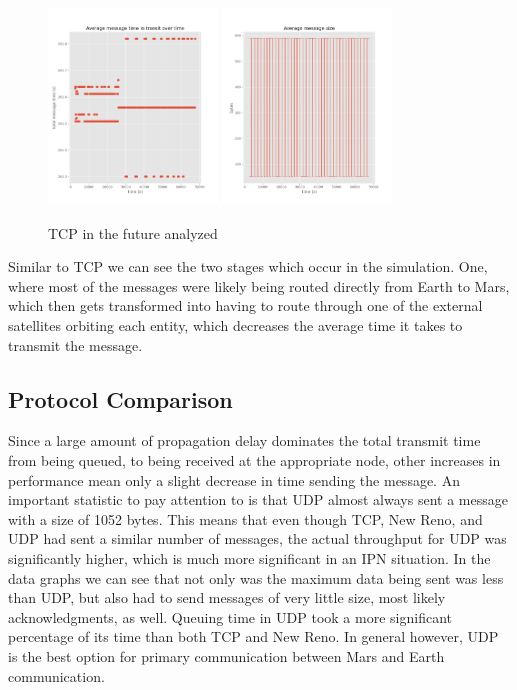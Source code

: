 \documentclass[a4paper,12pt]{article}
\begin{document}
\begin{figure}[h]
  \centering
  \includegraphics[width=0.4\textwidth]{media/new_reno.png}
  \includegraphics[width=0.4\textwidth]{media/new_reno_data.png}
  \caption{TCP in the future analyzed}
\end{figure}

Similar to TCP we can see the two stages which occur in the simulation. One,
where most of the messages were likely being routed directly from Earth to
Mars, which then gets transformed into having to route through one of the
external satellites orbiting each entity, which decreases the average time it
takes to transmit the message.

\subsection{Protocol Comparison}

Since a large amount of propagation delay dominates the total transmit time from
being queued, to being received at the appropriate node, other increases in
performance mean only a slight decrease in time sending the message. An
important statistic to pay attention to is that UDP almost always sent a message
with a size of 1052 bytes. This means that even though TCP, New Reno, and UDP
had sent a similar number of messages, the actual throughput for UDP was
significantly higher, which is much more significant in an IPN situation. In the
data graphs we can see that not only was the maximum data being sent was less
than UDP, but also had to send messages of very little size, most likely
acknowledgments, as well. Queuing time in UDP took a more significant percentage
of its time than both TCP and New Reno. In general however, UDP is the best
option for primary communication between Mars and Earth communication.
\end{document}
